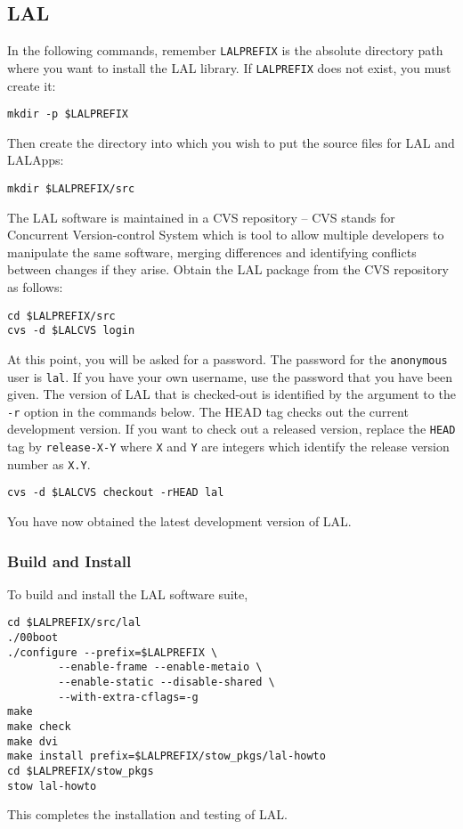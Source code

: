 \color{black}
\subsection{LAL}\label{ss:lal}
\color{black}

In the following commands, remember \verb+LALPREFIX+ is the
absolute directory path where you want to install the LAL library.  If
\verb+LALPREFIX+ does not exist,  you must create it:
\begin{verbatim}
mkdir -p $LALPREFIX
\end{verbatim}
Then create the directory into which you wish to put the source files for LAL
and LALApps:
\begin{verbatim}
mkdir $LALPREFIX/src
\end{verbatim}

The LAL software is maintained in a CVS repository -- CVS stands for
Concurrent Version-control System which is tool to allow multiple developers
to manipulate the same software,  merging differences and identifying
conflicts between changes if they arise.  Obtain the LAL package from the CVS
repository as follows:  
\begin{verbatim}
cd $LALPREFIX/src
cvs -d $LALCVS login
\end{verbatim}
At this point,  you will be asked for a password.  The password for the
\verb+anonymous+ user is \verb+lal+. If you have your own username, use the
password that you have been given.
The version of LAL that is checked-out is identified by the argument
to the \texttt{-r} option in the commands below.   The HEAD tag checks out the
current development version.  If you want to check out a released
version, replace the \verb+HEAD+ tag by \verb+release-X-Y+ where
\verb+X+ and \verb+Y+ are integers which identify the release version
number as \verb+X.Y+.
\begin{verbatim}
cvs -d $LALCVS checkout -rHEAD lal
\end{verbatim}
You have now obtained the latest development version of LAL.

\subsubsection{Build and Install}
To build and install the LAL software suite, 
\begin{verbatim}
cd $LALPREFIX/src/lal
./00boot
./configure --prefix=$LALPREFIX \
        --enable-frame --enable-metaio \
        --enable-static --disable-shared \
        --with-extra-cflags=-g
make
make check
make dvi
make install prefix=$LALPREFIX/stow_pkgs/lal-howto
cd $LALPREFIX/stow_pkgs
stow lal-howto
\end{verbatim}
This completes the installation and testing of LAL.  

